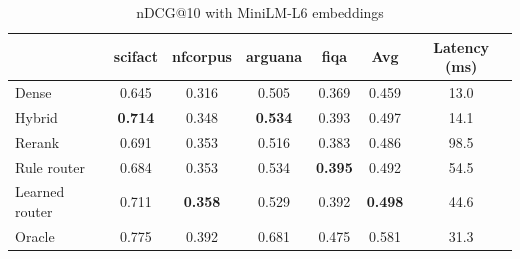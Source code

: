 \begin{table}[t]
\centering
\caption{nDCG@10 with MiniLM-L6 embeddings}
\label{tab:ndcg_MiniLM-L6}
\begin{tabular}{lcccccc}
\toprule
 & scifact & nfcorpus & arguana & fiqa & Avg & Latency (ms) \\
\midrule
Dense & 0.645 & 0.316 & 0.505 & 0.369 & 0.459 & 13.0 \\
Hybrid & \textbf{0.714} & 0.348 & \textbf{0.534} & 0.393 & 0.497 & 14.1 \\
Rerank & 0.691 & 0.353 & 0.516 & 0.383 & 0.486 & 98.5 \\
\midrule
Rule router & 0.684 & 0.353 & 0.534 & \textbf{0.395} & 0.492 & 54.5 \\
Learned router & 0.711 & \textbf{0.358} & 0.529 & 0.392 & \textbf{0.498} & 44.6 \\
Oracle & 0.775 & 0.392 & 0.681 & 0.475 & 0.581 & 31.3 \\
\bottomrule
\end{tabular}
\end{table}